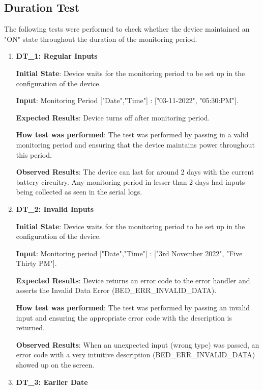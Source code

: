 \documentclass[12pt, titlepage]{article}
\begin{document}
\subsection{Duration Test}

The following tests were performed to check whether the device maintained an "ON" state throughout the duration of the monitoring period.
\begin{enumerate}

  \item{\textbf{DT\_1: Regular Inputs}\\}\label{DT1}

  \textbf{Initial State}: Device waits for the monitoring period to be set up in the configuration of the device.

  \textbf{Input}: Monitoring Period ["Date","Time"]  : ["03-11-2022", "05:30:PM"].

  \textbf{Expected Results}: Device turns off after monitoring period.

  \textbf{How test was performed}: The test was performed by passing in a valid monitoring period and ensuring that the device maintains power throughout this period.

  \textbf{Observed Results}: The device can last for around 2 days with the current battery circuitry. Any monitoring period in lesser than 2 days had inputs being collected as seen in the serial logs.

  \item{\textbf{DT\_2: Invalid Inputs}\\}\label{DT2}

  \textbf{Initial State}: Device waits for the monitoring period to be set up in the configuration of the device.

  \textbf{Input}: Monitoring period ["Date","Time"] : ["3rd November 2022", "Five Thirty PM"].

  \textbf{Expected Results}: Device returns an error code to the error handler and asserts the Invalid Data Error (BED\_ERR\_INVALID\_DATA).

  \textbf{How test was performed}: The test was performed by passing an invalid input and ensuring the appropriate error code with the description is returned.

  \textbf{Observed Results}: When an unexpected input (wrong type) was passed, an error code with a very intuitive description (BED\_ERR\_INVALID\_DATA) showed up on the screen.

  \item{\textbf{DT\_3: Earlier Date}\\}\label{DT3}


\end{enumerate}
\end{document}
